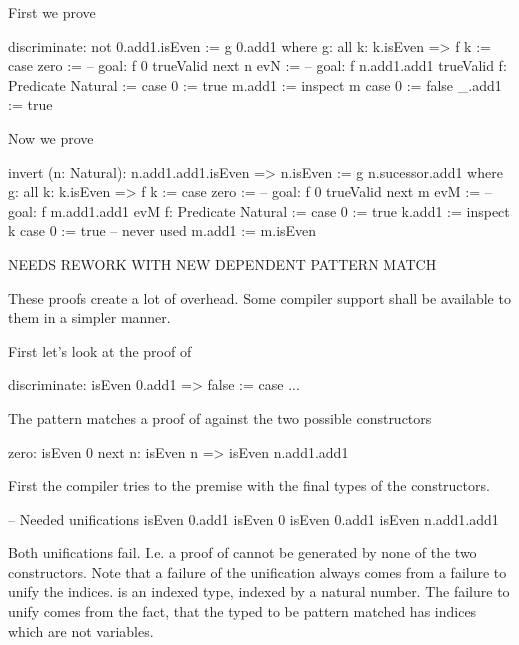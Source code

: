 \noindent First we prove 
%
\begin{alba}
    discriminate: not 0.add1.isEven
    :=
        g 0.add1
        where
            g: all k: k.isEven => f k :=
                case
                    zero :=
                        -- goal: f 0
                        trueValid
                    next n evN :=
                        -- goal: f n.add1.add1
                        trueValid
            f: Predicate Natural :=
                case
                    0 :=
                        true
                    m.add1 :=
                        inspect m case
                            0 :=
                                false
                            _.add1 :=
                                true
\end{alba}




\noindent Now we prove 
%
\begin{alba}
    invert (n: Natural): n.add1.add1.isEven => n.isEven
    :=
        g n.sucessor.add1
        where
            g: all k: k.isEven => f k :=
                case
                    zero :=
                        -- goal: f 0
                        trueValid
                    next m evM :=
                        -- goal: f m.add1.add1
                        evM
            f: Predicate Natural :=
                case
                    0 :=
                        true
                    k.add1 :=
                        inspect k case
                            0 :=
                                true -- never used
                            m.add1 :=
                                m.isEven
\end{alba}




\noindent NEEDS REWORK WITH NEW DEPENDENT PATTERN MATCH

These proofs create a lot of overhead. Some compiler support shall be available
to them in a simpler manner.

First let's look at the proof of
\begin{alba}
    discriminate: isEven 0.add1 => false :=
        case ...
\end{alba}
The pattern matches a proof of  against the two
possible constructors
\begin{alba}
    zero: isEven 0
    next n: isEven n => isEven n.add1.add1
\end{alba}
First the compiler tries to the premise with the final types of the
constructors.
\begin{alba}
    -- Needed unifications
    isEven 0.add1              isEven 0
    isEven 0.add1              isEven n.add1.add1
\end{alba}
Both unifications fail. I.e. a proof of  cannot be
generated by none of the two constructors. Note that a failure of the
unification always comes from a failure to unify the indices.  is
an indexed type, indexed by a natural number. The failure to unify comes from
the fact, that the typed to be pattern matched has indices which are not
variables.

